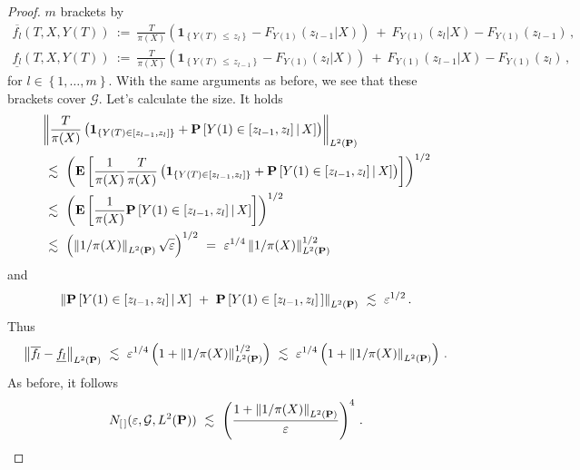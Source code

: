 \begin{proof}
  $m$ brackets by
 \begin{align*}
    \overline{f_l}(T,X,Y(T))
    \ 
    :=
    \ 
    \frac{T}{\pi(X)}
    \left( 
      \mathbf{1}_{\left\{  Y(T)\,\le\,z_{l} \right\}}
      -
      F_{Y(1)}(z_{l-1}|X)
    \right)
    \ 
    +
    \ 
    F_{Y(1)}(z_{l}|X)
-
F_{Y(1)}(z_{l-1})
\,,
\\
    \underline{f_l}(T,X,Y(T))
    \ 
    :=
    \ 
    \frac{T}{\pi(X)}
    \left( 
      \mathbf{1}_{\left\{  Y(T)\,\le\,z_{l-1} \right\}}
      -
      F_{Y(1)}(z_l|X)
    \right)
    \ 
    +
    \ 
    F_{Y(1)}(z_{l-1}|X)
-
      F_{Y(1)}(z_l)
\,,
  \end{align*}
  for $l\in \left\{ 1,\ldots,m \right\}$.
  With the same arguments as before, we see that these brackets cover $\mathcal{G}$.
  Let's calculate the size.
  It holds
  \begin{align*}
    &
    \norm{
      \frac{T}{\pi(X)}
      \left( 
      \mathbf{1}_{
      \left\{ 
      Y(T)\in [z_{l-1},z_l] 
    \right\}
    }
      +
      \P
      \left[ 
      Y(1)\in [z_{l-1},z_l] 
      \,
      |
      \,
      X
      \right]
      \right)
    }_{ L^2(\P)}
    \\
    &
    \
    \lesssim
    \
    \left( 
      \E
      \left[ 
        \frac{1}{\pi(X)}
        \frac{T}{\pi(X)}
      \left( 
      \mathbf{1}_{
      \left\{ 
      Y(T)\in [z_{l-1},z_l] 
    \right\}
    }
      +
      \P
      \left[ 
      Y(1)\in [z_{l-1},z_l] 
      \,
      |
      \,
      X
      \right]
      \right)
      \right]
    \right)
    ^{1/2}
    \\
    &
    \
    \lesssim
    \
    \left( 
      \E
      \left[ 
        \frac{1}{\pi(X)}
      \P
      \left[ 
      Y(1)\in [z_{l-1},z_l] 
      \,
      |
      \,
      X
      \right]
      \right]
    \right)
    ^{1/2}
    \\
    &
    \ 
    \lesssim
    \ 
    \left( 
      \norm{1/\pi(X)}_{ L^2(\P)}
      \sqrt{\varepsilon}
    \right)
    ^{1/2}
    \ 
    =
    \ 
    \varepsilon^{1/4}
    \norm{1/\pi(X)}_{ L^2(\P)}^{1/2}
  \end{align*}
  and
  \begin{align*}
     \norm{
      \P
      \left[ 
      Y(1)\in [z_{l-1},z_l] 
      \,
      |
      \,
      X
      \right]
      \ 
     + 
      \ 
      \P
      \left[ 
      Y(1)\in [z_{l-1},z_l] \,
      \right]
    }_{ L^2(\P)}
    \ 
    \lesssim
    \ 
    \varepsilon^{1/2}
    \,.
  \end{align*}
  Thus
  \begin{gather*}
  \norm{
  \overline{f_l}
-
  \underline{f_l}
}_
{ L^2(\P)}
\ 
\lesssim
\ 
\varepsilon^{1/4}
\left( 
  1
  +
    \norm{1/\pi(X)}_{ L^2(\P)}^{1/2}
\right)
\ 
\lesssim
\ 
\varepsilon^{1/4}
\left( 
  1
  +
    \norm{1/\pi(X)}_{ L^2(\P)}
\right)
\,.
  \end{gather*}
As before, it follows
\begin{gather*}
    N_{[\,]}
    (
    \varepsilon
    ,
    \mathcal{G}, L^2(\P))
    \ 
    \lesssim
    \ 
    \left( 
    \frac{
      1+
    \norm{1/\pi(X)}_{ L^2(\P)}
    }
    {\varepsilon}
    \right)^4
    \,.
\end{gather*}
\end{proof}

